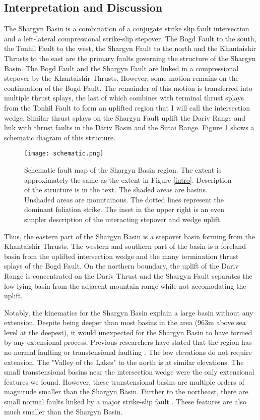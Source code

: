 \subsection{Interpretation and Discussion}
	The Shargyn Basin is a combination of a conjugate strike slip fault intersection and a left-lateral compressional strike-slip stepover. The Bogd Fault to the south, the Tonhil Fault to the west, the Shargyn Fault to the north and the Khantaishir Thrusts to the east are the primary faults governing the structure of the Shargyn Basin. The Bogd Fault and the Shargyn Fault are linked in a compressional stepover by the Khantaishir Thrusts. However, some motion remains on the continuation of the Bogd Fault. The remainder of this motion is transferred into multiple thrust splays, the last of which combines with terminal thrust splays from the Tonhil Fault to form an uplifted region that I will call the intersection wedge. Similar thrust splays on the Shargyn Fault uplift the Dariv Range and link with thrust faults in the Dariv Basin and the Sutai Range. Figure \ref{schematic} shows a schematic diagram of this structure.

\begin{figure}[h!]
  \centering
  \texttt{[image: schematic.png]}
  \caption{Schematic fault map of the Shargyn Basin region. The extent is approximately the same as the extent in Figure \ref{intro}. Description of the structure is in the text. The shaded areas are basins. Unshaded areas are mountainous. The dotted lines represent the dominant foliation strike. The inset in the upper right is an even simpler description of the interacting stepover and wedge uplift.}
  \label{schematic}
\end{figure}

	Thus, the eastern part of the Shargyn Basin is a stepover basin forming from the Khantaishir Thrusts. The western and southern part of the basin is a foreland basin from the uplifted intersection wedge and the many termination thrust splays of the Bogd Fault. On the northern boundary, the uplift of the Dariv Range is concentrated on the Dariv Thrust and the Shargyn Fault separates the low-lying basin from the adjacent mountain range while not accomodating the uplift.

	Notably, the kinematics for the Shargyn Basin explain a large basin without any extension. Despite being deeper than most basins in the area (963m above sea level at the deepest), it would unexpected for the Shargyn Basin to have formed by any extensional process. Previous researchers have stated that the region has no normal faulting or transtensional faulting \citep{Cunningham2005a}. The low elevations do not require extension. The "Valley of the Lakes" to the north is at similar elevations. The small transtensional basins near the intersection wedge were the only extensional features we found. However, these transtensional basins are multiple orders of magnitude smaller than the Shargyn Basin. Further to the northeast, there are small normal faults linked by a major strike-slip fault \citep{Walker2006}. These features are also much smaller than the Shargyn Basin.

